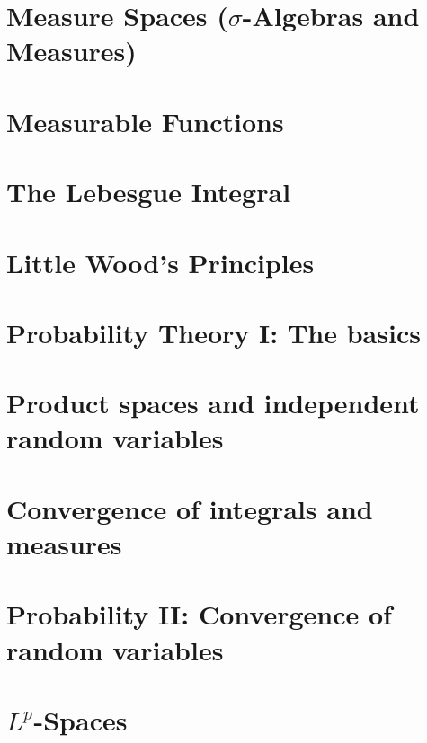 \documentclass{lecturenotes}
\begin{document}
\chapter{Measure Spaces ($\sigma$-Algebras and Measures)}
\label{chapter:sigma_algebras}


\chapter{Measurable Functions}
\label{chapter:measurable_functions}


\chapter{The Lebesgue Integral}
\label{chapter:integration}


\chapter{Little Wood's Principles}
\label{chapter:little_wood}


\chapter{Probability Theory I: The basics}
\label{chapter:probability_1}


\chapter{Product spaces and independent random variables}
\label{chapter:product_spaces}


\chapter{Convergence of integrals and measures}
\label{chapter:convergence}


\chapter{Probability II: Convergence of random variables}
\label{chapter:convergence_random_variabels}


\chapter{$L^p$-Spaces}
\label{chapter:lp_spaces}

\end{document}
